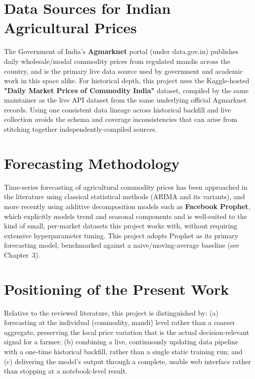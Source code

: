 \section{Data Sources for Indian Agricultural Prices}
The Government of India's \textbf{Agmarknet} portal (under data.gov.in)
publishes daily wholesale/modal commodity prices from regulated mandis
across the country, and is the primary live data source used by
government and academic work in this space alike. For historical depth,
this project uses the Kaggle-hosted \textbf{"Daily Market Prices of
Commodity India"} dataset, compiled by the same maintainer as the live
API dataset from the same underlying official Agmarknet records. Using
one consistent data lineage across historical backfill and live
collection avoids the schema and coverage inconsistencies that can arise
from stitching together independently-compiled sources.

\section{Forecasting Methodology}
Time-series forecasting of agricultural commodity prices has been
approached in the literature using classical statistical methods (ARIMA
and its variants), and more recently using additive decomposition models
such as \textbf{Facebook Prophet}, which explicitly models trend and
seasonal components and is well-suited to the kind of small,
per-market datasets this project works with, without requiring extensive
hyperparameter tuning. This project adopts Prophet as its primary
forecasting model, benchmarked against a naive/moving-average baseline
(see Chapter~3).

\section{Positioning of the Present Work}
Relative to the reviewed literature, this project is distinguished by:
(a) forecasting at the individual (commodity, mandi) level rather than a
coarser aggregate, preserving the local price variation that is the
actual decision-relevant signal for a farmer; (b) combining a live,
continuously updating data pipeline with a one-time historical backfill,
rather than a single static training run; and (c) delivering the model's
output through a complete, usable web interface rather than stopping at
a notebook-level result.
